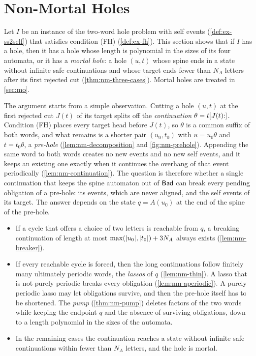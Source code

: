 
\section{Non-Mortal Holes}\label{sec:nm}

Let $I$ be an instance of the two-word hole problem with self events
(\cref{def:ex-ss2self}) that satisfies condition (FH) (\cref{def:ex-fh}). This section shows that if
$I$ has a hole, then it has a hole whose length is polynomial in the sizes of
its four automata, or it has a \emph{mortal hole}: a hole $(u,t)$ whose spine
ends in a state without infinite safe continuations and whose target ends
fewer than $N_A$ letters after its first rejected cut
(\cref{thm:nm-three-cases}). Mortal holes are treated in \cref{sec:mo}.

The argument starts from a simple observation. Cutting a hole $(u,t)$ at the
first rejected cut $J(t)$ of its target splits off the \emph{continuation}
$\theta=t[J(t){:}]$. Condition (FH) places every target head before $J(t)$,
so $\theta$ is a common suffix of both words, and what remains is a shorter
pair $(u_0,t_0)$ with $u=u_0\theta$ and $t=t_0\theta$, a \emph{pre-hole}
(\cref{lem:nm-decomposition} and \cref{fig:nm-prehole}). Appending the same
word to both words creates no new events and no new self events, and it keeps
an existing one exactly when it continues the overhang of that event
periodically (\cref{lem:nm-continuation}). The question is therefore whether
a single continuation that keeps the spine automaton out of $\mathsf{Bad}$ can break
every pending obligation of a pre-hole: its events, which are never aligned,
and the self events of its target. The answer depends on the state
$q=A(u_0)$ at the end of the spine of the pre-hole.
\begin{itemize}[leftmargin=*]
\item If a cycle that offers a choice of two letters is reachable from $q$,
  a breaking continuation of length at most $\max(\lvert u_0\rvert,\lvert t_0\rvert)+3N_A$
  always exists (\cref{lem:nm-breaker}).
\item If every reachable cycle is forced, then the long continuations follow
  finitely many ultimately periodic words, the \emph{lassos} of $q$
  (\cref{lem:nm-thin}). A lasso that is not purely periodic breaks every
  obligation (\cref{lem:nm-aperiodic}). A purely periodic lasso may let
  obligations survive, and then the pre-hole itself has to be shortened. The
  \emph{pump} (\cref{thm:nm-pump}) deletes factors of the two words while
  keeping the endpoint $q$ and the absence of surviving obligations, down to a
  length polynomial in the sizes of the automata.
\item In the remaining cases the continuation reaches a state without
  infinite safe continuations within fewer than $N_A$ letters, and the hole is
  mortal.
\end{itemize}

